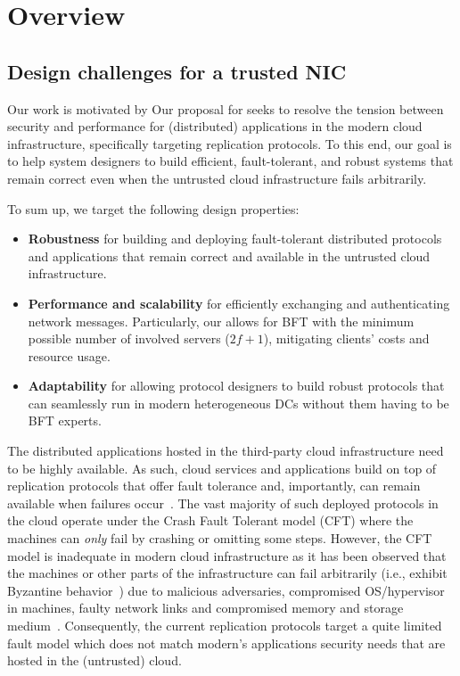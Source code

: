 \section{Overview}
\subsection{Design challenges for a trusted NIC}
\label{sec:requirements}
Our work is motivated by 
Our proposal for \projecttitle{} seeks to resolve the tension between security and performance for (distributed) applications in the modern cloud infrastructure, specifically targeting replication protocols. To this end, our goal is to help system designers to build efficient, fault-tolerant, and robust systems that remain correct even when the untrusted cloud infrastructure fails arbitrarily. 

To sum up, we target the following design properties: 
\begin{itemize}
    \item {\bf{Robustness}} for building and deploying fault-tolerant distributed protocols and applications that remain correct and available in the untrusted cloud infrastructure.
    \item {\bf{Performance and scalability}} for efficiently exchanging and authenticating network messages. Particularly, our \projecttitle{} allows for BFT with the minimum possible number of involved servers ($2f+1$), mitigating clients' costs and resource usage.
    \item {\bf{Adaptability}} for allowing protocol designers to build robust protocols that can seamlessly run in modern heterogeneous DCs without them having to be BFT experts. 
\end{itemize}


 The distributed applications hosted in the third-party cloud infrastructure need to be highly available. As such, cloud services and applications build on top of replication protocols that offer fault tolerance and, importantly, can remain available when failures occur~\cite{Jimenez-Peris2001}. The vast majority of such deployed protocols in the cloud operate under the Crash Fault Tolerant model (CFT) where the machines can {\em only} fail by crashing or omitting some steps. However, the CFT model is inadequate in modern cloud infrastructure as it has been observed that the machines or other parts of the infrastructure can fail arbitrarily (i.e., exhibit Byzantine behavior~\cite{Lamport:1982}) due to malicious adversaries, compromised OS/hypervisor in machines, faulty network links and compromised memory and storage medium~\cite{Gunawi_bugs-in-the-cloud, ciad, fast-08-corruption, security-one-sided-communication, accountable-cloud}. Consequently, the current replication protocols target a quite limited fault model which does not match modern's applications security needs that are hosted in the (untrusted) cloud.

